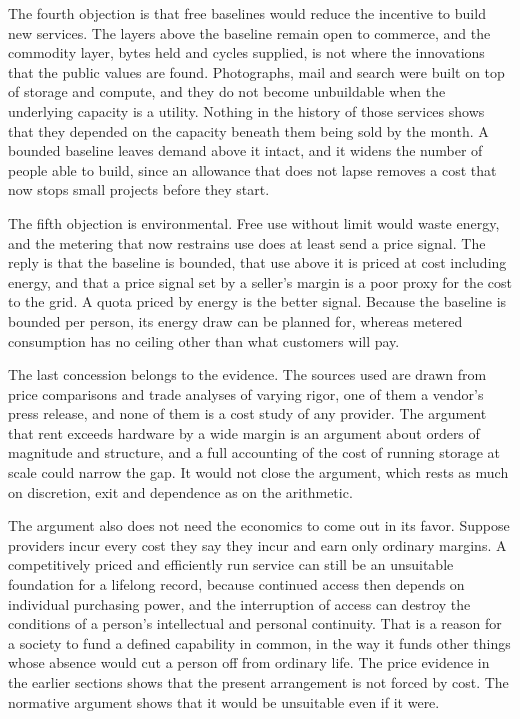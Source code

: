 \documentclass[11pt]{article}
\begin{document}
The fourth objection is that free baselines would reduce the incentive to build new services. The layers above the baseline remain open to commerce, and the commodity layer, bytes held and cycles supplied, is not where the innovations that the public values are found. Photographs, mail and search were built on top of storage and compute, and they do not become unbuildable when the underlying capacity is a utility. Nothing in the history of those services shows that they depended on the capacity beneath them being sold by the month. A bounded baseline leaves demand above it intact, and it widens the number of people able to build, since an allowance that does not lapse removes a cost that now stops small projects before they start.

The fifth objection is environmental. Free use without limit would waste energy, and the metering that now restrains use does at least send a price signal. The reply is that the baseline is bounded, that use above it is priced at cost including energy, and that a price signal set by a seller's margin is a poor proxy for the cost to the grid. A quota priced by energy is the better signal. Because the baseline is bounded per person, its energy draw can be planned for, whereas metered consumption has no ceiling other than what customers will pay.

The last concession belongs to the evidence. The sources used are drawn from price comparisons and trade analyses of varying rigor, one of them a vendor's press release, and none of them is a cost study of any provider. The argument that rent exceeds hardware by a wide margin is an argument about orders of magnitude and structure, and a full accounting of the cost of running storage at scale could narrow the gap. It would not close the argument, which rests as much on discretion, exit and dependence as on the arithmetic.

The argument also does not need the economics to come out in its favor. Suppose providers incur every cost they say they incur and earn only ordinary margins. A competitively priced and efficiently run service can still be an unsuitable foundation for a lifelong record, because continued access then depends on individual purchasing power, and the interruption of access can destroy the conditions of a person's intellectual and personal continuity. That is a reason for a society to fund a defined capability in common, in the way it funds other things whose absence would cut a person off from ordinary life. The price evidence in the earlier sections shows that the present arrangement is not forced by cost. The normative argument shows that it would be unsuitable even if it were.
\end{document}

